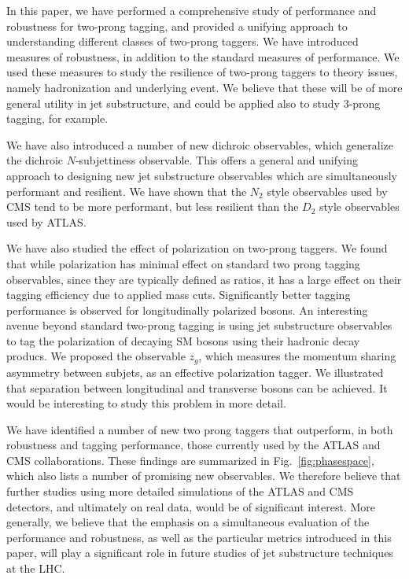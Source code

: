\documentclass[11pt,letterpaper]{article}
\DeclareRobustCommand{\Fig}[1]{Fig.~\ref{#1}}
\begin{document}
In this paper, we have performed a comprehensive study of performance and robustness for two-prong tagging, and provided a unifying approach to understanding different classes of two-prong taggers.  We have introduced measures of robustness, in addition to the standard measures of performance. We used these measures to study the resilience of two-prong taggers to theory issues, namely hadronization and underlying event.  We believe that these will be of more general utility in jet substructure, and could be applied also to study $3$-prong tagging, for example.

We have also introduced a number of new dichroic observables, which generalize the dichroic $N$-subjettiness observable. This offers a general and unifying approach to designing new jet substructure observables which are simultaneously performant and resilient. We have shown that the $N_2$ style observables used by CMS tend to be more performant, but less resilient than the $D_2$ style observables used by ATLAS.

We have also studied the effect of polarization on two-prong taggers. We found that while polarization has minimal effect on standard two prong tagging observables, since they are typically defined as ratios, it has a large effect on their tagging efficiency due to applied mass cuts. Significantly better tagging performance is observed for longitudinally polarized bosons. An interesting avenue beyond standard two-prong tagging is using jet substructure observables to tag the polarization of decaying SM bosons using their hadronic decay producs. We proposed the observable $z_g$, which measures the momentum sharing asymmetry between subjets, as an effective polarization tagger. We illustrated that separation between longitudinal and transverse bosons can be achieved. It would be interesting to study this problem in more detail.


We have identified a  number of new two prong taggers that outperform, in both robustness and tagging performance, those currently used by the ATLAS and CMS collaborations. These findings are summarized in \Fig{fig:phasespace}, which also lists a number of promising new observables. We therefore believe that further studies using more detailed simulations of the ATLAS and CMS detectors, and ultimately on real data, would be of significant interest. More generally, we believe that the emphasis on a simultaneous evaluation of the performance and robustness, as well as the particular metrics introduced in this paper, will play a significant role in future studies of jet substructure techniques at the LHC.
\end{document}
